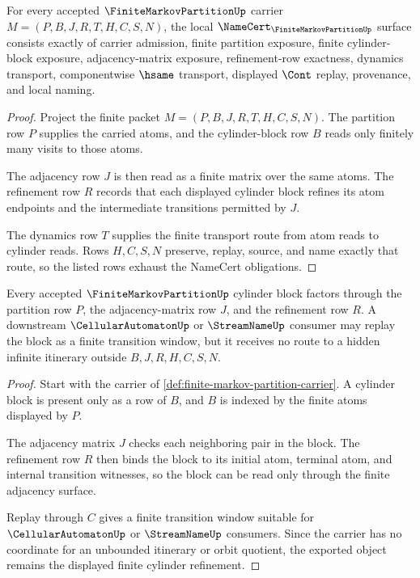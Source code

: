\begin{theorem}
\label{thm:finite-markov-partition-namecert-obligations}
For every accepted $\FiniteMarkovPartitionUp$ carrier $M=(P,B,J,R,T,H,C,S,N)$, the local $\NameCert_{\FiniteMarkovPartitionUp}$ surface consists exactly of carrier admission, finite partition exposure, finite cylinder-block exposure, adjacency-matrix exposure, refinement-row exactness, dynamics transport, componentwise $\hsame$ transport, displayed $\Cont$ replay, provenance, and local naming.
\end{theorem}
\begin{proof}
Project the finite packet $M=(P,B,J,R,T,H,C,S,N)$. The partition row $P$ supplies the carried atoms, and the cylinder-block row $B$ reads only finitely many visits to those atoms.

The adjacency row $J$ is then read as a finite matrix over the same atoms. The refinement row $R$ records that each displayed cylinder block refines its atom endpoints and the intermediate transitions permitted by $J$.

The dynamics row $T$ supplies the finite transport route from atom reads to cylinder reads. Rows $H,C,S,N$ preserve, replay, source, and name exactly that route, so the listed rows exhaust the NameCert obligations.
\end{proof}

\begin{theorem}
\label{thm:finite-markov-partition-cylinder-refinement}
Every accepted $\FiniteMarkovPartitionUp$ cylinder block factors through the partition row $P$, the adjacency-matrix row $J$, and the refinement row $R$. A downstream $\CellularAutomatonUp$ or $\StreamNameUp$ consumer may replay the block as a finite transition window, but it receives no route to a hidden infinite itinerary outside $B,J,R,H,C,S,N$.
\end{theorem}
\begin{proof}
Start with the carrier of \autoref{def:finite-markov-partition-carrier}. A cylinder block is present only as a row of $B$, and $B$ is indexed by the finite atoms displayed by $P$.

The adjacency matrix $J$ checks each neighboring pair in the block. The refinement row $R$ then binds the block to its initial atom, terminal atom, and internal transition witnesses, so the block can be read only through the finite adjacency surface.

Replay through $C$ gives a finite transition window suitable for $\CellularAutomatonUp$ or $\StreamNameUp$ consumers. Since the carrier has no coordinate for an unbounded itinerary or orbit quotient, the exported object remains the displayed finite cylinder refinement.
\end{proof}

